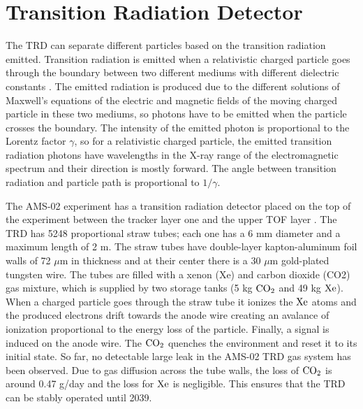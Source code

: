 
\section{Transition Radiation Detector} \label{TRDSection}

The TRD can separate different particles based on the transition radiation emitted. Transition radiation is emitted when a relativistic charged particle goes through the boundary between two different mediums with different dielectric constants \cite{TransitionRadiation_Ginzburg1945}. The emitted radiation is produced due to the different solutions of Maxwell's equations of the electric and magnetic fields of the moving charged particle in these two mediums, so photons have to be emitted when the particle crosses the boundary. The intensity of the emitted photon is proportional to the Lorentz factor $\gamma$, so for a relativistic charged particle, the emitted transition radiation photons have wavelengths in the X-ray range of the electromagnetic spectrum and their direction is mostly forward. The angle between transition radiation and particle path is proportional to $1/\gamma$.    \par


The AMS-02 experiment has a transition radiation detector placed on the top of the experiment between the tracker layer one and the upper TOF layer \cite{AMS02TRDPaper1, AMS02TRDPaper2}. The TRD has 5248 proportional straw tubes; each one has a 6 mm diameter and a maximum length of 2 m. The straw tubes have double-layer kapton-aluminum foil walls of 72 $\mu$m in thickness and at their center there is a 30 $\mu$m gold-plated tungsten wire. The tubes are filled with a xenon (Xe) and carbon dioxide (CO2) gas mixture, which is supplied by two storage tanks (5 kg $\rm CO_2$ and 49 kg $\rm Xe$). When a charged particle goes through the straw tube it ionizes the $\rm{Xe}$ atoms and the produced electrons drift towards the anode wire creating an avalance of ionization proportional to the energy loss of the particle. Finally, a signal is induced on the anode wire. The $\rm CO_2$ quenches the environment and reset it to its initial state. So far, no detectable large leak in the AMS-02 TRD gas system has been observed. Due to gas diffusion across the tube walls, the loss of $\rm CO_2$ is around 0.47 g/day and the loss for $\rm Xe$ is negligible. This ensures that the TRD can be stably operated until 2039.  \par

